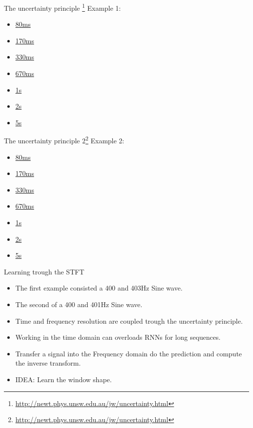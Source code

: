 \documentclass[xcolor=dvipsnames]{beamer}
\begin{document}
\begin{frame}{The uncertainty principle \footnote{\url{http://newt.phys.unsw.edu.au/jw/uncertainty.html}}}
Example 1:
\begin{itemize}
\item \href{run:./sounds/heisenberg/400+403-80ms.wav}{80ms}
\item \href{run:./sounds/heisenberg/400+403-170ms.wav}{170ms}
\item \href{run:./sounds/heisenberg/400+403-330ms.wav}{330ms}
\item \href{run:./sounds/heisenberg/400+403-670ms.wav}{670ms}
\item \href{run:./sounds/heisenberg/400+403-1s.wav}{1s}
\item \href{run:./sounds/heisenberg/400+403-2s.wav}{2s}
\item \href{run:./sounds/heisenberg/400+403-5s.wav}{5s}
\end{itemize}
\end{frame}

\begin{frame}{The uncertainty principle 2\footnote{\url{http://newt.phys.unsw.edu.au/jw/uncertainty.html}}}
Example 2:
\begin{itemize}
\item \href{run:./sounds/heisenberg/400+401-80ms.wav}{80ms}
\item \href{run:./sounds/heisenberg/400+401-170ms.wav}{170ms}
\item \href{run:./sounds/heisenberg/400+401-330ms.wav}{330ms}
\item \href{run:./sounds/heisenberg/400+401-670ms.wav}{670ms}
\item \href{run:./sounds/heisenberg/400+401-1s.wav}{1s}
\item \href{run:./sounds/heisenberg/400+401-2s.wav}{2s}
\item \href{run:./sounds/heisenberg/400+401-5s.wav}{5s}
\end{itemize}
\end{frame}


\begin{frame}{Learning trough the STFT}
\begin{itemize}
\item The first example consisted a 400 and 403Hz Sine wave.
\item The second of a 400 and 401Hz Sine wave.
\item Time and frequency resolution are coupled trough the uncertainty principle.
\item Working in the time domain can overloads RNNs for long sequences.
\item Transfer a signal into the Frequency domain do the prediction and compute the inverse transform.
\item IDEA: Learn the window shape.

\end{itemize}
\end{frame}
\end{document}
